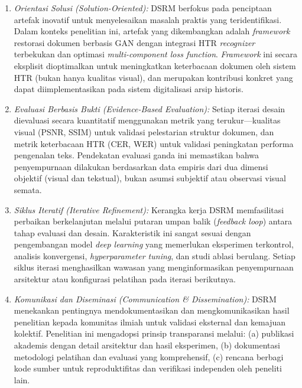 \documentclass[12pt,a4paper]{book}
\begin{document}
\begin{enumerate}[label=\arabic*., leftmargin=*, nosep]
\item \textit{Orientasi Solusi (Solution-Oriented):} DSRM berfokus pada penciptaan artefak inovatif untuk menyelesaikan masalah praktis yang teridentifikasi. Dalam konteks penelitian ini, artefak yang dikembangkan adalah \textit{framework} restorasi dokumen berbasis GAN dengan integrasi HTR \textit{recognizer} terbekukan dan optimasi \textit{multi-component loss function}. \textit{Framework} ini secara eksplisit dioptimalkan untuk meningkatkan keterbacaan dokumen oleh sistem HTR (bukan hanya kualitas visual), dan merupakan kontribusi konkret yang dapat diimplementasikan pada sistem digitalisasi arsip historis.

\item \textit{Evaluasi Berbasis Bukti (Evidence-Based Evaluation):} Setiap iterasi desain dievaluasi secara kuantitatif menggunakan metrik yang terukur---kualitas visual (PSNR, SSIM) untuk validasi pelestarian struktur dokumen, dan metrik keterbacaan HTR (CER, WER) untuk validasi peningkatan performa pengenalan teks. Pendekatan evaluasi ganda ini memastikan bahwa penyempurnaan dilakukan berdasarkan data empiris dari dua dimensi objektif (visual dan tekstual), bukan asumsi subjektif atau observasi visual semata.

\item \textit{Siklus Iteratif (Iterative Refinement):} Kerangka kerja DSRM memfasilitasi perbaikan berkelanjutan melalui putaran umpan balik (\textit{feedback loop}) antara tahap evaluasi dan desain. Karakteristik ini sangat sesuai dengan pengembangan model \textit{deep learning} yang memerlukan eksperimen terkontrol, analisis konvergensi, \textit{hyperparameter tuning}, dan studi ablasi berulang. Setiap siklus iterasi menghasilkan wawasan yang menginformasikan penyempurnaan arsitektur atau konfigurasi pelatihan pada iterasi berikutnya.

\item \textit{Komunikasi dan Diseminasi (Communication \& Dissemination):} DSRM menekankan pentingnya mendokumentasikan dan mengkomunikasikan hasil penelitian kepada komunitas ilmiah untuk validasi eksternal dan kemajuan kolektif. Penelitian ini mengadopsi prinsip transparansi melalui: (a) publikasi akademis dengan detail arsitektur dan hasil eksperimen, (b) dokumentasi metodologi pelatihan dan evaluasi yang komprehensif, (c) rencana berbagi kode sumber untuk reproduktifitas dan verifikasi independen oleh peneliti lain.
\end{enumerate}
\end{document}

